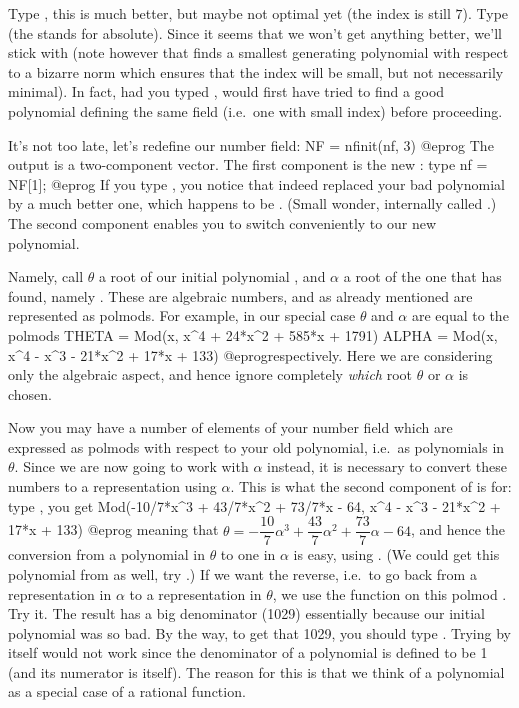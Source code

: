   Type , this is much better, but maybe not optimal yet
(the index is still $7$). Type  (the  stands for
absolute). Since it seems that we won't get anything better, we'll stick with
 (note however that  finds a smallest generating
polynomial with respect to a bizarre norm which ensures that the index will
be small, but not necessarily minimal). In fact, had you typed
,  would first have tried to find a good
polynomial defining the same field (i.e.~one with small index) before
proceeding.

  It's not too late, let's redefine our number field:
\bprog
  NF = nfinit(nf, 3)
@eprog\noindent
The output is a two-component vector. The first component is the new
: type
\bprog
  nf = NF[1];
@eprog\noindent
If you type , you notice that  indeed replaced your bad
polynomial  by a much better one, which happens to be . (Small
wonder,  internally called .) The second component
enables you to switch conveniently to our new polynomial.

Namely, call $\theta$ a root of our initial polynomial , and $\alpha$
a root of the one that  has found, namely . These are
algebraic numbers, and as already mentioned are represented as polmods. For
example, in our special case $\theta$ and $\alpha$ are equal to the polmods
\bprog
  THETA = Mod(x, x^4 + 24*x^2 + 585*x + 1791)
  ALPHA = Mod(x, x^4 - x^3 - 21*x^2 + 17*x + 133)
@eprog\noindent respectively. Here we are considering only the algebraic
aspect, and hence ignore completely \emph{which} root $\theta$ or $\alpha$ is
chosen.

Now you may have a number of elements of your number field which are
expressed as polmods with respect to your old polynomial, i.e.~as polynomials
in $\theta$. Since we are now going to work with $\alpha$ instead, it is
necessary to convert these numbers to a representation using $\alpha$. This
is what the second component of  is for: type , you get
\bprog
  Mod(-10/7*x^3 + 43/7*x^2 + 73/7*x - 64, x^4 - x^3 - 21*x^2 + 17*x + 133)
@eprog\noindent
meaning that $\theta =
-\dfrac{10}{7}\alpha^3+\dfrac{43}{7}\alpha^2+\dfrac{73}{7}\alpha-64$, and hence the conversion from a
polynomial in $\theta$ to one in $\alpha$ is easy, using . (We
could get this polynomial from  as well, try .)
If we want the reverse, i.e.~to go back from a representation in $\alpha$ to
a representation in $\theta$, we use the function  on this
polmod . Try it. The result has a big denominator (1029) essentially
because our initial polynomial  was so bad. By the way, to get that
1029,
you should type . Trying  by
itself would not work since the denominator of a polynomial is defined to be
1 (and its numerator is itself). The reason for this is that we think of a
polynomial as a special case of a rational function.\smallskip

